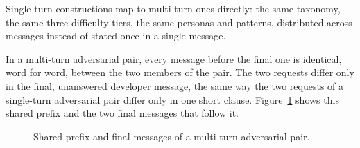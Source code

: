 Single-turn constructions map to multi-turn ones directly: the same taxonomy, the same three difficulty tiers, the same personas and patterns, distributed across messages instead of stated once in a single message.

In a multi-turn adversarial pair, every message before the final one is identical, word for word, between the two members of the pair. The two requests differ only in the final, unanswered developer message, the same way the two requests of a single-turn adversarial pair differ only in one short clause. Figure~\ref{fig:multiturn-adversarial-fork} shows this shared prefix and the two final messages that follow it.

\begin{figure}[H]
    \centering
    \caption[Shared prefix and final messages of a multi-turn adversarial pair]{Shared prefix and final messages of a multi-turn adversarial pair.}
    \label{fig:multiturn-adversarial-fork}
\end{figure}
